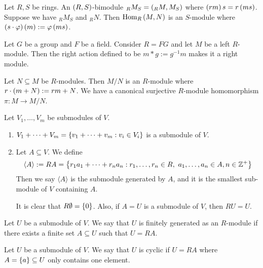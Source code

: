 \medskip

\begin{re}
    Let $R,S$ be rings. An $\left(R,S\right)$-bimodule $_RM_S=\left(_RM,M_S\right)$ where $\left(rm\right)s = r\left(ms\right)$. Suppose we have $_RM_S$ and $_RN$. Then $\operatorname{Hom}_R\left(M,N\right)$ is an $S$-module where $\left(s\cdot \varphi\right)\left(m\right):=\varphi\left(ms\right)$.
\end{re}

\medskip

\begin{ex}
    Let $G$ be a group and $F$ be a field. Consider $R=FG$ and let $M$ be a left $R$-module. Then the right action defined to be $m*g := g^{-1}m$ makes it a right module.
\end{ex}

\medskip

\begin{pro}
    Let $N\subseteq M$ be $R$-modules. Then $M/N$ is an $R$-module where $r\cdot \left(m+N\right):= rm+N$. We have a canonical surjective $R$-module homomorphism $\pi:M\to M/N$.
\end{pro}

\medskip 

\begin{ex}
    Let $V_1,\dots, V_m$ be submodules of $V$.
    \begin{enumerate}
        \item $V_1+\dots + V_m = \left\{v_1+\dots+ v_m :v_i\in V_i\right\}$ is a submodule of $V$.
        \item Let $A\subseteq V$. We define
        \[\langle A\rangle := RA = \left\{r_1a_1 +\dots+ r_na_n:r_1,\dots ,r_n \in R,\ a_1, \dots, a_n \in A,n\in {\mathbb Z}^+\right\}\]
        Then we say $\langle A \rangle$ is the submodule generated by $A$, and it is the smallest sub-module of $V$ containing $A$.

        \medskip
        
        It is clear that $R\emptyset = \left\{0\right\}$. Also, if $A=U$ is a submodule of $V$, then $RU = U$.
    \end{enumerate}
\end{ex}

\medskip

\begin{defn} 
    Let $U$ be a submodule of $V$. We say that $U$ is finitely generated as an $R$-module if there exists a finite set $A\subseteq U$ such that $U=RA$.
\end{defn}

\medskip

\begin{defn} [Cyclic]
    Let $U$ be a submodule of $V$. We say that $U$ is cyclic if $U=RA$ where $A=\left\{a\right\}\subseteq U$ only contains one element.
\end{defn}

